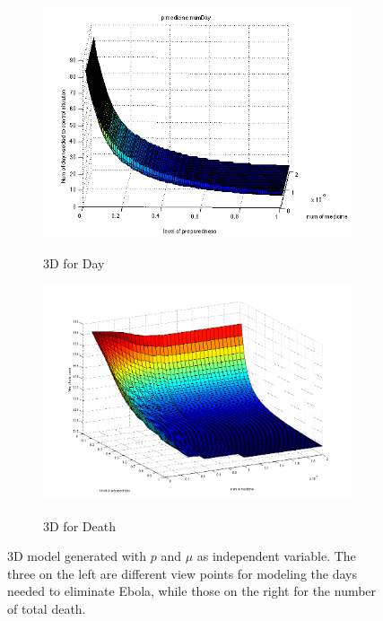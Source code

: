 \documentclass[12pt,a4paper,titlepage]{article}
\begin{document}
\begin{figure}[htbp]
\begin{subfigure}[b]{0.45\textwidth}
      	\includegraphics[width=\textwidth]{figures/imgpMedDay3.png}
      	\label{figure_3dDay3}
      	\caption{3D for Day}
  	\end{subfigure}
  	\begin{subfigure}[b]{0.45\textwidth}
      	\includegraphics[width=\textwidth]{figures/imgpMedDeath3.png}
      	\label{figure_3dDeath3}
      	\caption{3D for Death}
  	\end{subfigure}
  	\caption{3D model generated with $p$ and $\mu$ as independent variable. The three on the left are different view points for modeling the days needed to eliminate Ebola, while those on the right for the number of total death.}
  	\label{figure_3d}
\end{figure}
\end{document}
